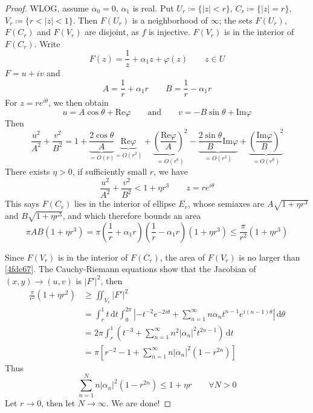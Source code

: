 \begin{proof}
WLOG, assume $\alpha_0=0$, $\alpha_1$ is real. Put $U_{r}\coloneqq \{ \lvert z \rvert<r \}$, $C_{r}\coloneqq \{ \lvert z \rvert=r \}$, $V_{r}\coloneqq \{ r<\lvert z \rvert<1 \}$. Then $F(U_{r})$ is a neighborhood of $\infty$; the sets $F(U_{r})$, $F(C_{r})$ and $F(V_{r})$ are disjoint, as $f$ is injective. $F(V_{r})$ is in the interior of $F(C_{r})$. Write
\[
F(z)=\frac{1}{z}+\alpha_1z+\varphi(z)\qquad z\in U
\]
$F=u+i v$ and
\[
A=\frac{1}{r}+\alpha_1r\qquad B=\frac{1}{r}-\alpha_1r
\]
For $z=re^{ i\theta }$, we then obtain
\[
u=A\cos\theta+\mathrm{Re}\varphi \qquad \text{and}\qquad v=-B\sin\theta+\mathrm{Im}\varphi
\]
Then
\[
\frac{u^2}{A^2}+\frac{v^2}{B^2}=1+\underbrace{ \frac{2\cos\theta}{A} }_{ =O(r) }\underbrace{ \mathrm{Re}\varphi }_{ =O(r^2) }+\underbrace{ \left( \frac{\mathrm{Re}\varphi}{A} \right)^2 }_{ =O(r^{6}) }-\underbrace{ \frac{2\sin\theta}{B}\mathrm{Im}\varphi }_{ =O(r^{3}) }+\underbrace{ \left( \frac{\mathrm{Im}\varphi}{B} \right)^2 }_{ =O(r^{6}) }
\]
There exists $\eta>0$, if sufficiently small $r$, we have
\[
\frac{u^2}{A^2}+\frac{v^2}{B^2}<1+\eta r^3\qquad z=re^{ i\theta }
\]
This says $F(C_{r})$ lies in the interior of ellipse $E_{r}$, whose semiaxes are $A\sqrt{ 1+\eta r^{3} }$ and $B\sqrt{ 1+\eta r^{3} }$, and which therefore bounds an area
\begin{equation}
\pi AB(1+\eta r^{3})=\pi\left( \frac{1}{r}+\alpha_1r \right)\left( \frac{1}{r}-\alpha_1r \right)(1+\eta r^3)\leq \frac{\pi}{r^2}(1+\eta r^{3})
\label{4fdc67}
\end{equation}

Since $F(V_{r})$ is in the interior of $F(C_{r})$, the area of $F(V_{r})$ is no larger than \cref{4fdc67}. The Cauchy-Riemann equations show that the Jacobian of $(x,y)\to(u,v)$ is $\lvert F' \rvert ^2$, then
\[
\begin{aligned}
\frac{\pi}{r^2}(1+\eta r^2) & \geq \iint_{V_{r}}\lvert F' \rvert ^2 \\
 & =\int_{r}^{1} t \, \mathrm{d}t\int_{0}^{2\pi} \left\lvert  -t^{-2}e^{ -2i\theta }+\sum_{n=1}^{\infty} n\alpha _nt^{n-1}e^{ i(n-1)\theta }  \right\rvert  \, \mathrm{d}\theta  \\
 & =2\pi \int_{r}^{1} \left( t^{-3}+\sum_{n=1}^{\infty} n^2\lvert \alpha _n \rvert ^2t^{2n-1} \right) \, \mathrm{d}t \\
  & =\pi\left[ r^{-2}-1+\sum_{n=1}^{\infty} n \lvert \alpha _n \rvert ^2(1-r^{2n}) \right]
\end{aligned}
\]
Thus
\[
\sum_{n=1}^{N} n \lvert \alpha _n \rvert ^2(1-r^{2n})\leq 1+\eta r\qquad \forall N>0
\]
Let $r\to0$, then let $N\to \infty$. We are done!
\end{proof}

